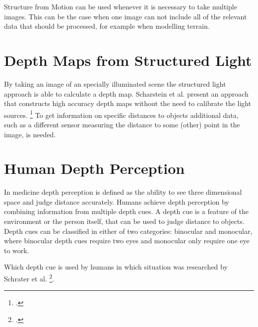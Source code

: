 Structure from Motion can be used whenever it is necessary to take multiple images. This can be the case when one image can not include all of the relevant data that should be processed, for example when modelling terrain.

\newpage

\section{Depth Maps from Structured Light}
By taking an image of an specially illuminated scene the structured light approach is able to calculate a depth map. Scharstein et al. present an approach that constructs high accuracy depth maps without the need to calibrate the light sources. \footcite{Scharstein_High-accuracy_stereo_depth_maps_using_structured_light} To get information on specific distances to objects additional data, such as a different sensor measuring the distance to some (other) point in the image, is needed.

\section{Human Depth Perception}
\label{sec:studyOfLiterature_humanDepthPerception}

In medicine depth perception is defined as the ability to see three dimensional space and judge distance accurately. Humans achieve depth perception by combining information from multiple depth cues. A depth cue is a feature of the environment or the person itself, that can be used to judge distance to objects. Depth cues can be classified in either of two categories: binocular and monocular, where binocular depth cues require two eyes and monocular only require one eye to work.

Which depth cue is used by humans in which situation was researched by Schrater et al. \footcite{Schrater_How_optimal_depth_cue_integration_depends_on_the_task}.

